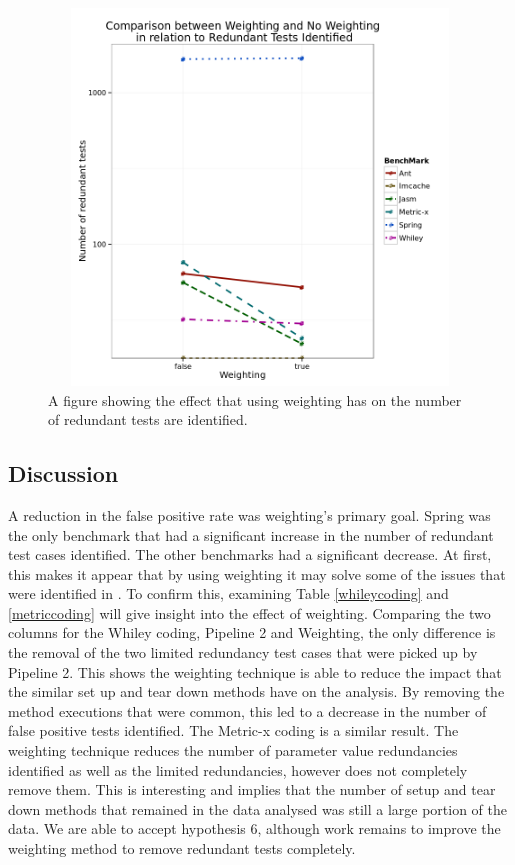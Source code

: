\begin{figure}[h]
\begin{center}
\includegraphics[height=10cm, width = 14.5cm]{Weighting.png}
\end{center}
\caption{A figure showing the effect that using weighting has on the number of redundant tests are identified.}
\label{fig:weightgraph}
\end{figure}

\subsection{Discussion}
A reduction in the false positive rate was weighting's primary goal. Spring was the only benchmark that had a significant increase in the number of redundant test cases identified. The other benchmarks had a significant decrease. At first, this makes it appear that by using weighting it may solve some of the issues that were identified in \cite{koochakzadeh2009test} \cite{li2008static}. To confirm this, examining Table \ref{whileycoding} and \ref{metriccoding} will give insight into the effect of weighting. Comparing the two columns for the Whiley coding, Pipeline 2 and Weighting, the only difference is the removal of the two limited redundancy test cases that were picked up by Pipeline 2. This shows the weighting technique is able to reduce the impact that the similar set up and tear down methods have on the analysis. By removing the method executions that were common, this led to a decrease in the number of false positive tests identified. The Metric-x coding is a similar result. The weighting technique reduces the number of parameter value redundancies identified as well as the limited redundancies, however does not completely remove them. This is interesting and implies that the number of setup and tear down methods that remained in the data analysed was still a large portion of the data. We are able to accept hypothesis 6, although work remains to improve the weighting method to remove redundant tests completely.


